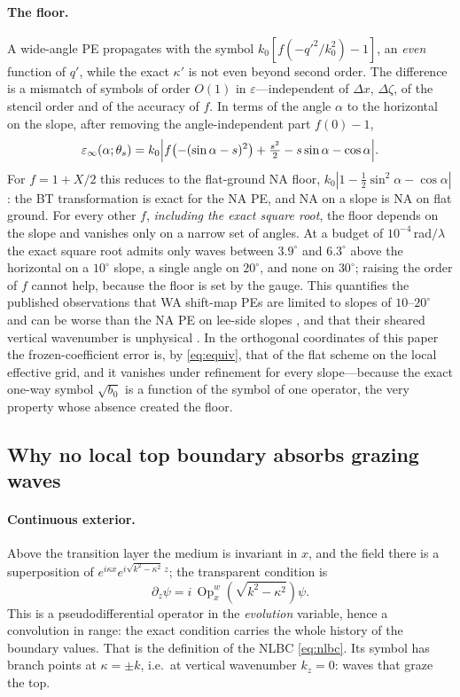 \documentclass[11pt]{article}
\newcommand{\pd}{\partial}
\newcommand{\Op}{\operatorname{Op}^w}
\begin{document}
\paragraph{The floor.} A wide-angle PE propagates with the symbol
$k_0[f(-q'^2/k_0^2)-1]$, an \emph{even} function of $q'$, while the exact
$\kappa'$ is not even beyond second order. The difference is a mismatch of
symbols of order $O(1)$ in $\varepsilon$---independent of $\Delta x$,
$\Delta\zeta$, of the stencil order and of the accuracy of $f$. In terms of
the angle $\alpha$ to the horizontal on the slope, after removing the
angle-independent part $f(0)-1$,
\begin{equation}\label{eq:floor}
\varepsilon_\infty(\alpha;\theta_s)
=k_0\Bigl|f\bigl(-(\sin\alpha-s)^2\bigr)+\tfrac{s^2}2-s\sin\alpha-\cos\alpha\Bigr| .
\end{equation}
For $f=1+X/2$ this reduces to the flat-ground NA floor,
$k_0|1-\tfrac12\sin^2\alpha-\cos\alpha|$: the BT transformation is exact for
the NA PE, and NA on a slope is NA on flat ground. For every other $f$,
\emph{including the exact square root}, the floor depends on the slope and
vanishes only on a narrow set of angles. At a budget of $10^{-4}$\,rad$/\lambda$
the exact square root admits only waves between $3.9^\circ$ and $6.3^\circ$
above the horizontal on a $10^\circ$ slope, a single angle on $20^\circ$, and
none on $30^\circ$; raising the order of $f$ cannot help, because the floor
is set by the gauge. This quantifies the published observations that WA
shift-map PEs are limited to slopes of $10$--$20^\circ$ and can be worse than
the NA PE on lee-side slopes \cite{wang2020smpe,zhou2017lfhighangle}, and that
their sheared vertical wavenumber is unphysical \cite{gilbert2022wabt}. In the
orthogonal coordinates of this paper the frozen-coefficient error is, by
\eqref{eq:equiv}, that of the flat scheme on the local effective grid, and it
vanishes under refinement for every slope---because the exact one-way symbol
$\sqrt{b_0}$ is a function of the symbol of one operator, the very property
whose absence created the floor.

\subsection{Why no local top boundary absorbs grazing waves}\label{sec:top}

\paragraph{Continuous exterior.} Above the transition layer the medium is
invariant in $x$, and the field there is a superposition of
$e^{i\kappa x}e^{i\sqrt{k^2-\kappa^2}\,z}$; the transparent condition is
\begin{equation}\label{eq:tnlbc}
\pd_z\psi=i\,\Op_x\!\left(\sqrt{k^2-\kappa^2}\right)\psi .
\end{equation}
This is a pseudodifferential operator in the \emph{evolution} variable, hence
a convolution in range: the exact condition carries the whole history of the
boundary values. That is the definition of the NLBC \eqref{eq:nlbc}. Its
symbol has branch points at $\kappa=\pm k$, i.e.\ at vertical wavenumber
$k_z=0$: waves that graze the top.
\end{document}
